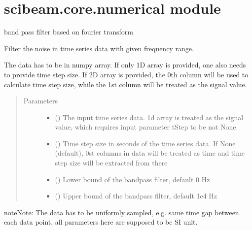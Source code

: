\documentclass[letterpaper,10pt,english]{sphinxmanual}
\begin{document}
\section{scibeam.core.numerical module}
\label{\detokenize{scibeam.core:module-scibeam.core.numerical}}\label{\detokenize{scibeam.core:scibeam-core-numerical-module}}

\begin{fulllineitems}
\label{\detokenize{scibeam.core:scibeam.core.numerical.bandPassFilter}}
band pass filter based on fourier transform

Filter the noise in time series data with given frequency range.

The data has to be in numpy array. If only 1D array is provided, one also
needs to provide time step size. If 2D array is provided, the 0th column
will be used to calculate time step size, while the 1st column will be
treated as the signal value.
\begin{quote}\begin{description}
\item[{Parameters}] \leavevmode\begin{itemize}
\item {} 
 () \textendash{} The input time series data.
1d array is treated as the signal value, which requires input parameter
tStep to be not None.

\item {} 
 () \textendash{} Time step size in seconds of the time series data.
If None (default), 0st columns in data will be treated as time and time
step size will be extracted from there

\item {} 
 () \textendash{} Lower bound of the bandpass filter, default 0 Hz

\item {} 
 () \textendash{} Upper bound of the bandpass filter, default 1e4 Hz

\end{itemize}

\end{description}\end{quote}

\begin{sphinxadmonition}{note}{Note:}
The data has to be uniformly sampled, e.g. same time gap between each data
point, all parameters here are supposed to be SI unit.
\end{sphinxadmonition}

\end{fulllineitems}
\end{document}
